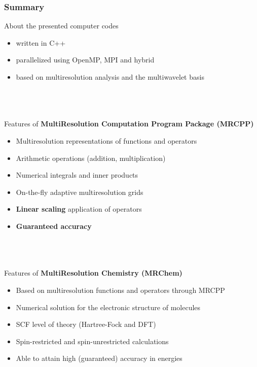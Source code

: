 \documentclass[mathserif, 8pt]{beamer}
\begin{document}
\begin{frame}
    \frametitle{Summary}
    About the presented computer codes
    \begin{itemize}
	\item	written in C++
	\item	parallelized using OpenMP, MPI and hybrid
	\item	based on multiresolution analysis and the multiwavelet basis
    \end{itemize}
    \ \\
    \ \\
    \ \\
    Features of \textbf{MultiResolution Computation Program Package (MRCPP)}
    \begin{itemize}
	\item	Multiresolution representations of functions and operators
	\item	Arithmetic operations (addition, multiplication)
	\item	Numerical integrals and inner products
	\item	On-the-fly adaptive multiresolution grids
	\item	\textbf{Linear scaling} application of operators
	\item	\textbf{Guaranteed accuracy}
    \end{itemize}
    \ \\
    \ \\
    \ \\
    Features of \textbf{MultiResolution Chemistry (MRChem)}
    \begin{itemize}
	\item	Based on multiresolution functions and operators through MRCPP
	\item	Numerical solution for the electronic structure of molecules
	\item	SCF level of theory (Hartree-Fock and DFT)
	\item	Spin-restricted and spin-unrestricted calculations
	\item	Able to attain high (guaranteed) accuracy in energies
    \end{itemize}
\end{frame}
\end{document}

